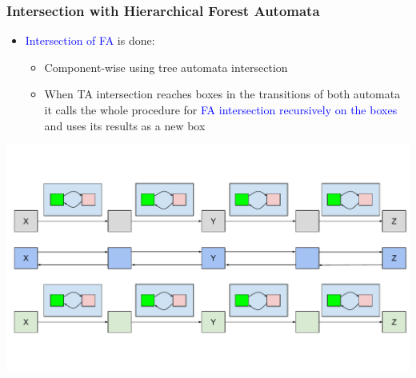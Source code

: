 \documentclass{beamer}
\newcommand{\hlbl}[1]{\textcolor{blue}{#1}}
\begin{document}
\begin{frame}
\frametitle{Intersection with Hierarchical Forest Automata}

  	\begin{itemize}
	\item \hlbl{Intersection of FA} is done:
		  	\begin{itemize}
				\item Component-wise using tree automata intersection
				\item When TA intersection reaches boxes in the transitions of both automata it calls the whole
					procedure for \hlbl{FA intersection recursively on the boxes} and uses its results as a new box
			\end{itemize}
	\end{itemize}
	\begin{center}
		\includegraphics[scale=0.4]{ex/is.pdf}
	\end{center}

\end{frame}
\end{document}
